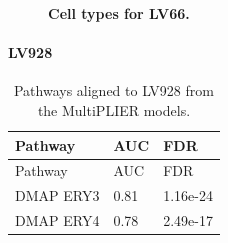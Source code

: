 \documentclass[
  a4paper,
]{article}
\newenvironment{fignos:tagged-figure}[1][]{
  \let\oldfigurename\figurename
  \renewcommand{\figurename}{Supplementary Figure}
}{
  \let\figurename\oldfigurename
}
\newenvironment{tablenos:tagged-table}[1][]{
  \let\oldtablename\tablename
  \renewcommand{\tablename}{Supplementary Table}
}{
  \let\tablename\oldtablename
}
\begin{document}
\begin{fignos:tagged-figure}[S16]

\begin{figure}
\hypertarget{fig:sup:lv66}{%
\centering

\caption{\textbf{Cell types for LV66.}
}\label{fig:sup:lv66}
}
\end{figure}

\end{fignos:tagged-figure}

\clearpage

\hypertarget{lv928}{%
\paragraph{LV928}\label{lv928}}

\begin{tablenos:tagged-table}[S12]

\begin{longtable}[]{@{}lll@{}}
\caption{Pathways aligned to LV928 from the MultiPLIER models.
\label{tbl:sup:multiplier_pathways:lv928}}\label{tbl:sup:multiplier_pathways:lv928}\tabularnewline
\toprule()
Pathway & AUC & FDR \\
\midrule()
\endfirsthead
\toprule()
Pathway & AUC & FDR \\
\midrule()
\endhead
DMAP ERY3 & 0.81 & 1.16e-24 \\
DMAP ERY4 & 0.78 & 2.49e-17 \\
\bottomrule()
\end{longtable}

\end{tablenos:tagged-table}
\end{document}
